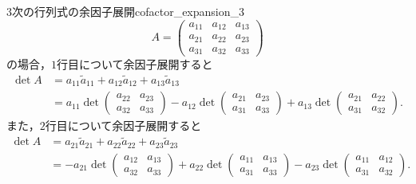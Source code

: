 \begin{example}{3次の行列式の余因子展開}{cofactor_expansion_3}
  \[
  A = \begin{pmatrix}
    a_{11} & a_{12} & a_{13} \\
    a_{21} & a_{22} & a_{23} \\
    a_{31} & a_{32} & a_{33}
  \end{pmatrix}
  \]
  の場合，$1$行目について余因子展開すると
  \begin{align*}
    \det A
    &= a_{11}\tilde{a}_{11} + a_{12}\tilde{a}_{12} + a_{13}\tilde{a}_{13} \\
    &= a_{11}\det\begin{pmatrix}
      a_{22} & a_{23} \\
      a_{32} & a_{33}
    \end{pmatrix}
    - a_{12}\det\begin{pmatrix}
      a_{21} & a_{23} \\
      a_{31} & a_{33}
    \end{pmatrix}
    + a_{13}\det\begin{pmatrix}
      a_{21} & a_{22} \\
      a_{31} & a_{32}
    \end{pmatrix}.
  \end{align*}
  また，$2$行目について余因子展開すると
  \begin{align*}
    \det A
    &= a_{21}\tilde{a}_{21} + a_{22}\tilde{a}_{22} + a_{23}\tilde{a}_{23} \\
    &= -a_{21}\det\begin{pmatrix}
      a_{12} & a_{13} \\
      a_{32} & a_{33}
    \end{pmatrix}
    + a_{22}\det\begin{pmatrix}
      a_{11} & a_{13} \\
      a_{31} & a_{33}
    \end{pmatrix}
    - a_{23}\det\begin{pmatrix}
      a_{11} & a_{12} \\
      a_{31} & a_{32}
    \end{pmatrix}.
  \end{align*}


\end{example}

